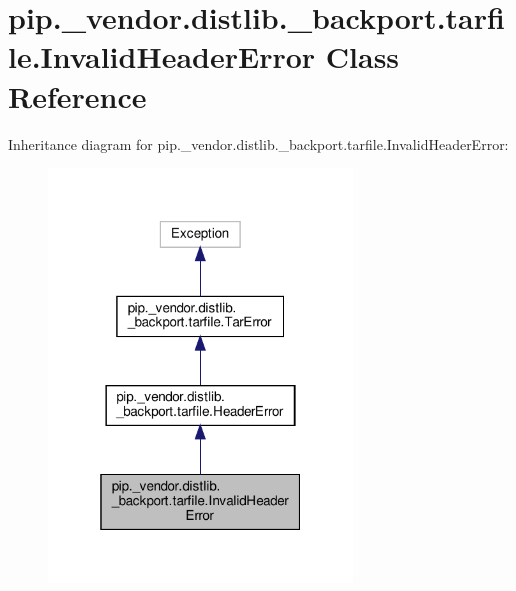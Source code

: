\hypertarget{classpip_1_1__vendor_1_1distlib_1_1__backport_1_1tarfile_1_1InvalidHeaderError}{}\section{pip.\+\_\+vendor.\+distlib.\+\_\+backport.\+tarfile.\+Invalid\+Header\+Error Class Reference}
\label{classpip_1_1__vendor_1_1distlib_1_1__backport_1_1tarfile_1_1InvalidHeaderError}


Inheritance diagram for pip.\+\_\+vendor.\+distlib.\+\_\+backport.\+tarfile.\+Invalid\+Header\+Error\+:
\nopagebreak
\begin{figure}[H]
\begin{center}
\leavevmode
\includegraphics[width=229pt]{classpip_1_1__vendor_1_1distlib_1_1__backport_1_1tarfile_1_1InvalidHeaderError__inherit__graph}
\end{center}
\end{figure}


